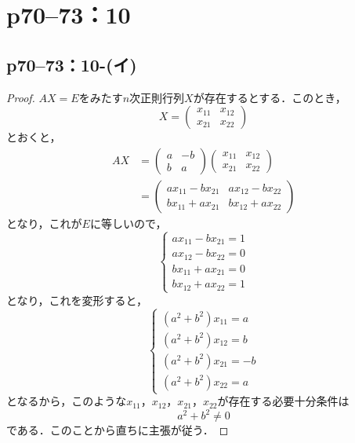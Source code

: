 \documentclass[a4paper,10pt,fleqn]{ltjsarticle}
\begin{document}
\newpage


\section*{p70--73：10}

\subsection*{p70--73：10-(イ)}

\begin{tleftbar}
  \begin{proof}
    $AX=E$をみたす$n$次正則行列$X$が存在するとする．このとき，
    \[
      X = \begin{pmatrix} x_{11} & x_{12} \\ x_{21} & x_{22} \end{pmatrix}
    \]
    とおくと，
    \begin{align*}
      AX & = \begin{pmatrix} a & -b \\ b & a \end{pmatrix} \begin{pmatrix} x_{11} & x_{12} \\ x_{21} & x_{22} \end{pmatrix} \\
         & = \begin{pmatrix} ax_{11}-bx_{21} & ax_{12}-bx_{22} \\ bx_{11}+ax_{21} & bx_{12}+ax_{22} \end{pmatrix}
    \end{align*}
    となり，これが$E$に等しいので，
    \[
      \begin{cases}
        ax_{11}-bx_{21} =1 \\
        ax_{12}-bx_{22} =0 \\
        bx_{11}+ax_{21} =0 \\
        bx_{12}+ax_{22} =1
      \end{cases}
    \]
    となり，これを変形すると，
    \[
      \begin{cases}
        (a^2+b^2) x_{11} = a \\
        (a^2+b^2) x_{12} = b \\
        (a^2+b^2) x_{21}=-b  \\
        (a^2+b^2) x_{22} = a
      \end{cases}
    \]
    となるから，このような$x_{11}$，$x_{12}$，$x_{21}$，$x_{22}$が存在する必要十分条件は
    \[
      a^2 + b^2 \ne 0
    \]
    である．このことから直ちに主張が従う．
  \end{proof}
\end{tleftbar}
\end{document}
